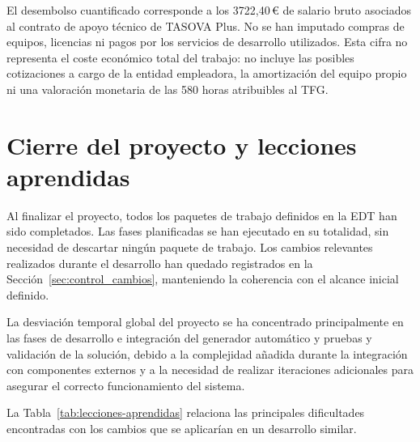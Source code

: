 El desembolso cuantificado corresponde a los 3722,40\,€ de salario
bruto asociados al contrato de apoyo técnico de TASOVA Plus. No se han
imputado compras de equipos, licencias ni pagos por los servicios de
desarrollo utilizados. Esta cifra no representa el coste económico
total del trabajo: no incluye las posibles cotizaciones a cargo de la
entidad empleadora, la amortización del equipo propio ni una valoración
monetaria de las 580 horas atribuibles al TFG.

\section{Cierre del proyecto y lecciones aprendidas}
\label{sec:cierre}


Al finalizar el proyecto, todos los paquetes de trabajo definidos en la EDT han sido completados. Las fases planificadas se han ejecutado en su totalidad, sin necesidad de descartar ningún paquete de trabajo. Los cambios relevantes realizados durante el desarrollo han quedado registrados en la Sección~\ref{sec:control_cambios}, manteniendo la coherencia con el alcance inicial definido.

La desviación temporal global del proyecto se ha concentrado principalmente en las fases de desarrollo e integración del generador automático y pruebas y validación de la solución, debido a la complejidad añadida durante la integración con componentes externos y a la necesidad de realizar iteraciones adicionales para asegurar el correcto funcionamiento del sistema.

La Tabla~\ref{tab:lecciones-aprendidas} relaciona las principales
dificultades encontradas con los cambios que se aplicarían en un
desarrollo similar.

